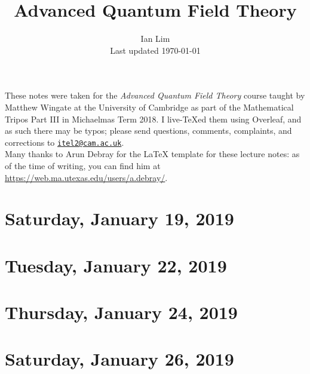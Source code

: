 \documentclass[reqno]{amsart}
\begin{document}
\title{Advanced Quantum Field Theory}
\author{Ian Lim\\ Last updated \today}
\maketitle
{\small\noindent These notes were taken for the \textit{Advanced Quantum Field Theory} course taught by Matthew Wingate at the University of Cambridge as part of the Mathematical Tripos Part III in Michaelmas Term 2018. I live-\TeX ed them using Overleaf, and as such there may be typos; please send questions, comments, complaints, and corrections to 
\href{mailto:itel2@cam.ac.uk?subject=AQFT\%20Lecture\%20Notes}{\texttt{itel2@cam.ac.uk}}.\\
Many thanks to Arun Debray for the {\LaTeX} template for these lecture notes: as of the time of writing, you can find him at \url{https://web.ma.utexas.edu/users/a.debray/}.}

\tableofcontents

\section{Saturday, January 19, 2019}
	

\section{Tuesday, January 22, 2019}
	

\section{Thursday, January 24, 2019}
    
    
\section{Saturday, January 26, 2019}
    
\end{document}
